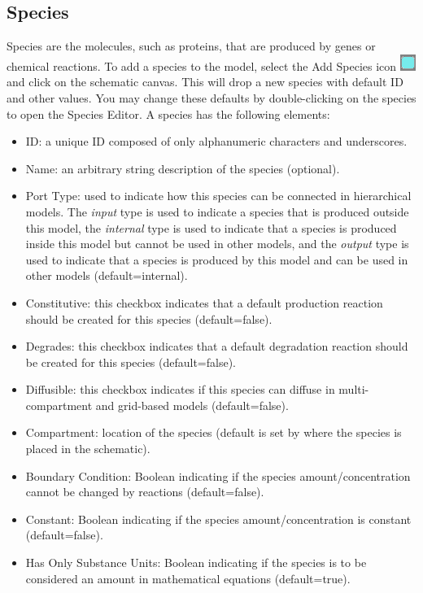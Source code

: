 \documentclass[titlepage,11pt]{article}
\begin{document}
\subsection{\label{Species}Species}

\noindent
Species are the molecules, such as proteins, that are produced by genes or chemical reactions.  To add a species to the model, select the Add Species icon \includegraphics{../gui/icons/modelview/add_species_selected} and click on the schematic canvas.  This will drop a new species with default ID and other values.  You may change these defaults by double-clicking on the species to open the Species Editor.  A species has the following elements:
\begin{itemize} 
\item ID: a unique ID composed of only alphanumeric characters and underscores.
\item Name: an arbitrary string description of the species (optional).
\item Port Type: used to indicate how this species can be connected in hierarchical models.  The \emph{input} type is used to indicate a species that is produced outside this model, the \emph{internal} type is used to indicate that a species is produced inside this model but cannot be used in other models, and the \emph{output} type is used to indicate that a species is produced by this model and can be used in other models (default=internal). 
\item Constitutive: this checkbox indicates that a default production reaction should be created for this species (default=false).
\item Degrades: this checkbox indicates that a default degradation reaction should be created for this species (default=false).
\item Diffusible: this checkbox indicates if this species can diffuse in multi-compartment and grid-based models (default=false).
\item Compartment: location of the species (default is set by where the species is placed in the schematic).
\item Boundary Condition: Boolean indicating if the species amount/concentration cannot be changed by reactions (default=false).
\item Constant: Boolean indicating if the species amount/concentration is constant (default=false).
\item Has Only Substance Units: Boolean indicating if the species is to be considered an amount in mathematical equations (default=true).

\end{itemize}
\end{document}
